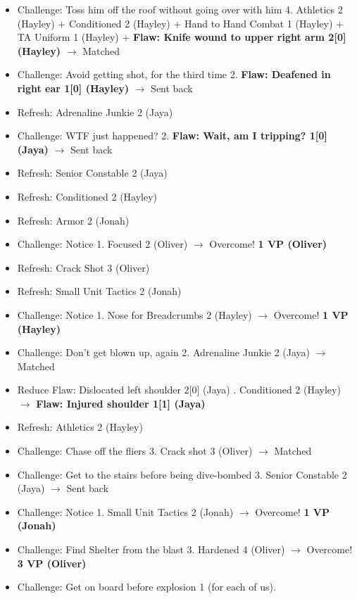 \begin{itemize}
\item Challenge: Toss him off the roof without going over with him 4. Athletics 2 (Hayley) + Conditioned 2 (Hayley) + Hand to Hand Combat 1 (Hayley) + TA Uniform 1 (Hayley) + \textbf{ {\color[RGB]{255,0,0}Flaw: Knife wound to upper right arm 2{[}0{]} (Hayley)} } $\rightarrow$ Matched
\item Challenge: Avoid getting shot, for the third time 2.  \textbf{ {\color[RGB]{255,0,0}Flaw: Deafened in right ear 1{[}0{]} (Hayley)} } $\rightarrow$ Sent back
\item Refresh: Adrenaline Junkie 2 (Jaya)
\item Challenge: WTF just happened? 2. \textbf{ {\color[RGB]{255,0,0}Flaw: Wait, am I tripping? 1{[}0{]} (Jaya)} } $\rightarrow$ Sent back
\item Refresh: Senior Constable 2 (Jaya)
\item Refresh: Conditioned 2 (Hayley)
\item Refresh: Armor 2 (Jonah)
\item Challenge: Notice 1. Focused 2 (Oliver) $\rightarrow$ Overcome! \textbf{1 VP (Oliver)}
\item Refresh: Crack Shot 3 (Oliver)
\item Refresh: Small Unit Tactics 2 (Jonah)
\item Challenge: Notice 1. Nose for Breadcrumbs 2 (Hayley) $\rightarrow$ Overcome! \textbf{1 VP (Hayley)}
\item Challenge: Don't get blown up, again 2. Adrenaline Junkie 2 (Jaya) $\rightarrow$ Matched
\item  {\color[RGB]{255,0,0}Reduce Flaw: Dislocated left shoulder 2{[}0{]} (Jaya)} .  Conditioned 2 (Hayley) $\rightarrow$ \textbf{ {\color[RGB]{255,0,0}Flaw: Injured shoulder 1{[}1{]} (Jaya)} }
\item Refresh: Athletics 2 (Hayley)
\item Challenge: Chase off the fliers 3. Crack shot 3 (Oliver) $\rightarrow$ Matched
\item Challenge: Get to the stairs before being dive-bombed 3. Senior Constable 2 (Jaya) $\rightarrow$ Sent back
\item Challenge: Notice 1.  Small Unit Tactics 2 (Jonah) $\rightarrow$ Overcome! \textbf{1 VP (Jonah)}
\item Challenge: Find Shelter from the blast 3. Hardened 4 (Oliver) $\rightarrow$ Overcome! \textbf{3 VP (Oliver)}
\item Challenge: Get on board before explosion 1 (for each of us).
\end{itemize}

